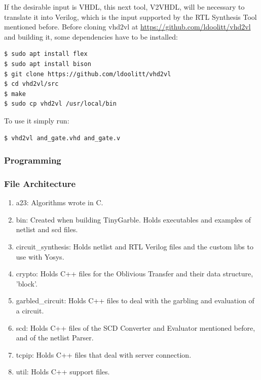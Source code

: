 \begin{refsection}
If the desirable input is VHDL, this next tool, V2VHDL, will be necessary to translate it into Verilog, which is the input supported by the RTL Synthesis Tool mentioned before.
Before cloning vhd2vl at \url{https://github.com/ldoolitt/vhd2vl} and building it, some dependencies have to be installed:

\begin{lstlisting}[caption={Installation of VHD2VL}, language=bash, captionpos=b]                                                                                                                                                                                  
$ sudo apt install flex                                                                                                                                                                         
$ sudo apt install bison
$ git clone https://github.com/ldoolitt/vhd2vl
$ cd vhd2vl/src
$ make
$ sudo cp vhd2vl /usr/local/bin
\end{lstlisting}

To use it simply run:

\begin{lstlisting}[caption={Translation of VHDL file into Verilog}, language=bash, captionpos=b] 
$ vhd2vl and_gate.vhd and_gate.v	
\end{lstlisting}

\newpage

\subsubsection{Programming}

\subsubsection{File Architecture}

\begin{enumerate}
\item a23: Algorithms wrote in C.
\item bin: Created when building TinyGarble. Holds executables and examples of netlist and scd files.
\item circuit\_synthesis: Holds netlist and RTL Verilog files and the custom libs to use with Yosys.
\item crypto: Holds C++ files for the Oblivious Transfer and their data structure, 'block'.
\item garbled\_circuit: Holds C++ files to deal with the garbling and evaluation of a circuit.
\item scd:  Holds C++ files of the SCD Converter and Evaluator mentioned before, and of the netlist Parser.
\item tcpip: Holds C++ files that deal with server connection.
\item util: Holds C++ support files.
\end{enumerate}


\end{refsection}
